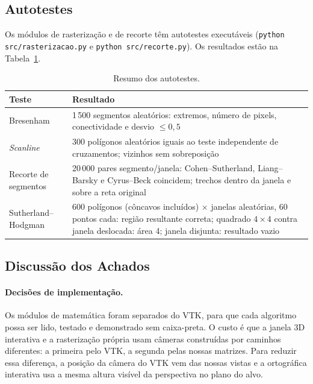 \documentclass[11pt, a4paper]{article}
\begin{document}
\subsection{Autotestes}
Os módulos de rasterização e de recorte têm autotestes executáveis (\texttt{python src/rasterizacao.py}
e \texttt{python src/recorte.py}). Os resultados estão na Tabela~\ref{tab:testes}.

\begin{table}[htbp]
\centering\small
\begin{tabular}{@{}p{3.2cm}p{10.3cm}@{}}
\toprule
\textbf{Teste} & \textbf{Resultado}\\
\midrule
Bresenham & 1\,500 segmentos aleatórios: extremos, número de pixels, conectividade e desvio $\le0{,}5$ \\
\emph{Scanline} & 300 polígonos aleatórios iguais ao teste independente de cruzamentos; vizinhos sem sobreposição\\
Recorte de segmentos & 20\,000 pares segmento/janela: Cohen--Sutherland, Liang--Barsky e Cyrus--Beck coincidem; trechos dentro da janela e sobre a reta original\\
Sutherland--Hodgman & 600 polígonos (côncavos incluídos) $\times$ janelas aleatórias, 60 pontos cada: região resultante correta; quadrado $4\times4$ contra janela deslocada: área 4; janela disjunta: resultado vazio\\
\bottomrule
\end{tabular}
\caption{Resumo dos autotestes.}\label{tab:testes}
\end{table}

\subsection{Discussão dos Achados}
\label{sec:disc}

\paragraph{Decisões de implementação.} Os módulos de matemática foram separados do VTK,
para que cada algoritmo possa ser lido, testado e demonstrado sem caixa-preta. O custo
é que a janela 3D interativa e a rasterização própria usam câmeras construídas por
caminhos diferentes: a primeira pelo VTK, a segunda pelas nossas matrizes. Para
reduzir essa diferença, a posição da câmera do VTK vem das nossas vistas e a ortográfica interativa usa
a mesma altura visível da perspectiva no plano do alvo.
\end{document}
